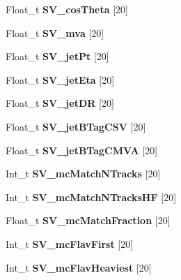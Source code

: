 \begin{DoxyCompactItemize}
Float\+\_\+t {\bfseries S\+V\+\_\+cos\+Theta} \mbox{[}20\mbox{]}
\item 
\hypertarget{classMiniTree_af18cd40fbf43c26c2163d8bae1614892}{}\label{classMiniTree_af18cd40fbf43c26c2163d8bae1614892} 
Float\+\_\+t {\bfseries S\+V\+\_\+mva} \mbox{[}20\mbox{]}
\item 
\hypertarget{classMiniTree_aa92f31306e412987599939200e49e080}{}\label{classMiniTree_aa92f31306e412987599939200e49e080} 
Float\+\_\+t {\bfseries S\+V\+\_\+jet\+Pt} \mbox{[}20\mbox{]}
\item 
\hypertarget{classMiniTree_a0126c3ca00938413f691e4abdbf66a8e}{}\label{classMiniTree_a0126c3ca00938413f691e4abdbf66a8e} 
Float\+\_\+t {\bfseries S\+V\+\_\+jet\+Eta} \mbox{[}20\mbox{]}
\item 
\hypertarget{classMiniTree_adbd3e6a713a2634185151f044f82794a}{}\label{classMiniTree_adbd3e6a713a2634185151f044f82794a} 
Float\+\_\+t {\bfseries S\+V\+\_\+jet\+DR} \mbox{[}20\mbox{]}
\item 
\hypertarget{classMiniTree_a0072c4cad34394656a9082fcecb56f7d}{}\label{classMiniTree_a0072c4cad34394656a9082fcecb56f7d} 
Float\+\_\+t {\bfseries S\+V\+\_\+jet\+B\+Tag\+C\+SV} \mbox{[}20\mbox{]}
\item 
\hypertarget{classMiniTree_acda986c8582732a51edbd11463b0372c}{}\label{classMiniTree_acda986c8582732a51edbd11463b0372c} 
Float\+\_\+t {\bfseries S\+V\+\_\+jet\+B\+Tag\+C\+M\+VA} \mbox{[}20\mbox{]}
\item 
\hypertarget{classMiniTree_a05134307c12f946ae438732b61825d05}{}\label{classMiniTree_a05134307c12f946ae438732b61825d05} 
Int\+\_\+t {\bfseries S\+V\+\_\+mc\+Match\+N\+Tracks} \mbox{[}20\mbox{]}
\item 
\hypertarget{classMiniTree_a01026ed950e3e24bad5b3289d6258f2e}{}\label{classMiniTree_a01026ed950e3e24bad5b3289d6258f2e} 
Int\+\_\+t {\bfseries S\+V\+\_\+mc\+Match\+N\+Tracks\+HF} \mbox{[}20\mbox{]}
\item 
\hypertarget{classMiniTree_a8973db25ee0f3149040bc3977f7234c7}{}\label{classMiniTree_a8973db25ee0f3149040bc3977f7234c7} 
Float\+\_\+t {\bfseries S\+V\+\_\+mc\+Match\+Fraction} \mbox{[}20\mbox{]}
\item 
\hypertarget{classMiniTree_a205f7c1d1b3e9cab216f78dac3e67b49}{}\label{classMiniTree_a205f7c1d1b3e9cab216f78dac3e67b49} 
Int\+\_\+t {\bfseries S\+V\+\_\+mc\+Flav\+First} \mbox{[}20\mbox{]}
\item 
\hypertarget{classMiniTree_a8d89d8beb1d1292b9cb162de6f384a26}{}\label{classMiniTree_a8d89d8beb1d1292b9cb162de6f384a26} 
Int\+\_\+t {\bfseries S\+V\+\_\+mc\+Flav\+Heaviest} \mbox{[}20\mbox{]}

\end{DoxyCompactItemize}
